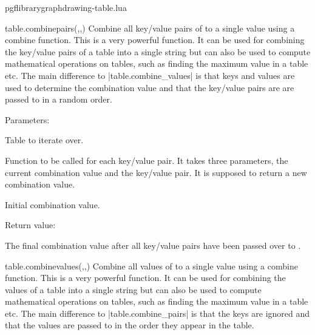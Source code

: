 
\begin{filedescription}{pgflibrarygraphdrawing-table.lua}


\begin{luacommand}{{table.combine\textunderscore{}pairs}(,,)}
Combine all key/value pairs of  to a single value using a combine function.  This is a very powerful function. It can be used for combining the key/value pairs of a table into a single string but can also be used to compute mathematical operations on tables, such as finding the maximum value in a table etc.  The main difference to |table.combine_values| is that keys and values are used to determine the combination value and that the key/value pairs are are passed to  in a random order. 

Parameters:
\begin{parameterdescription}
	\item[\meta{table}] Table to iterate over.\item[\meta{combine\_func}] Function to be called for each key/value pair. It takes three parameters, the current combination value and the key/value pair. It is supposed to return a new combination value.\item[\meta{initial\_value}] Initial combination value. 
\end{parameterdescription}


Return value:
\begin{parameterdescription} 
  \item[] The final combination value after all key/value pairs have been passed over to . 
\end{parameterdescription}


\end{luacommand}
\begin{luacommand}{{table.combine\textunderscore{}values}(,,)}
Combine all values of  to a single value using a combine function.  This is a very powerful function. It can be used for combining the values of a table into a single string but can also be used to compute mathematical operations on tables, such as finding the maximum value in a table etc.  The main difference to |table.combine_pairs| is that the keys are ignored and that the values are passed to  in the order they appear in the table. 


\end{luacommand}
\end{filedescription}
